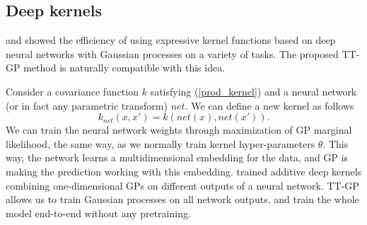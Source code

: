 \subsection{Deep kernels}

  \citet{wilson2016stochastic} and \citet{wilson2016deep} showed the efficiency
  of using expressive kernel functions based on deep neural networks with
  Gaussian processes on a variety of tasks. The proposed TT-GP method is
  naturally compatible with this idea.

  Consider a covariance function $k$ satisfying (\ref{prod_kernel}) and
  a neural network (or in fact any parametric transform) $net$. We can define a
  new kernel as follows
  \[
    k_{net}(x, x') = k(net(x), net(x')).
  \]
  We can train the neural network weights through maximization of GP marginal
  likelihood, the same way, as we normally train kernel hyper-parameters $\theta$.
  This way, the network learns a multidimensional embedding for the data, and
  GP is making the prediction working with this embedding.
  \citet{wilson2016stochastic} trained additive deep kernels combining 
  one-dimensional GPs on different outputs
  of a neural network. TT-GP allows us to train Gaussian processes on all network
  outputs, and train the whole model end-to-end without any pretraining.
